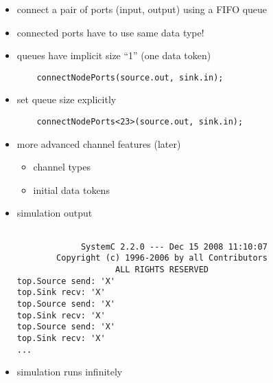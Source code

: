 \begin{frame}[fragile=singleslide]
\begin{itemize}
\item connect a pair of ports (input, output) using a FIFO queue
\item connected ports have to use same data type!
\item queues have implicit size ``1'' (one data token)
\begin{lstlisting}
    connectNodePorts(source.out, sink.in);
\end{lstlisting}
\item set queue size explicitly
\begin{lstlisting}
    connectNodePorts<23>(source.out, sink.in);
\end{lstlisting}
\item more advanced channel features (later)
\begin{itemize}
\item channel types
\item initial data tokens
\end{itemize}
\end{itemize}
\end{frame}




\begin{frame}[fragile=singleslide]
\begin{itemize}
\item simulation output
\begin{lstlisting}

             SystemC 2.2.0 --- Dec 15 2008 11:10:07
        Copyright (c) 1996-2006 by all Contributors
                    ALL RIGHTS RESERVED
top.Source send: 'X'
top.Sink recv: 'X'
top.Source send: 'X'
top.Sink recv: 'X'
top.Source send: 'X'
top.Sink recv: 'X'
...
\end{lstlisting}
\item simulation runs infinitely
\end{itemize}
\end{frame}






